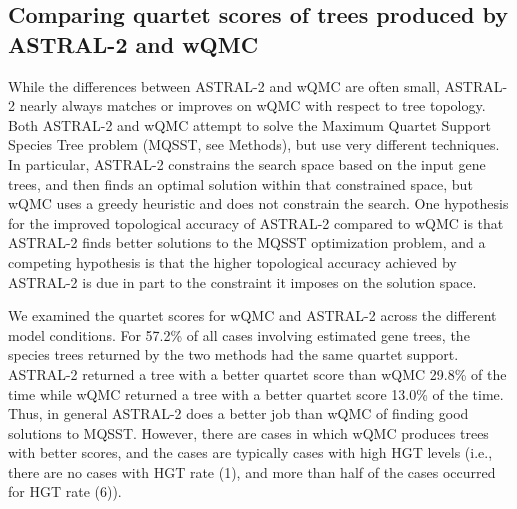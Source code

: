 \subsection{Comparing quartet scores of trees produced by ASTRAL-2 and wQMC}

While the differences between ASTRAL-2 and wQMC are often
small, ASTRAL-2 nearly always matches or improves on wQMC with respect to tree
topology.  Both ASTRAL-2 and wQMC attempt to 
solve the Maximum Quartet Support Species Tree problem (MQSST, see Methods), but
use very different techniques. In particular,  ASTRAL-2
constrains the search space based on the input gene trees, and
then finds an optimal solution within that constrained space, but
 wQMC uses a greedy
heuristic and does not constrain the search.  
One hypothesis for the improved topological accuracy of ASTRAL-2 compared to wQMC is
that ASTRAL-2 finds better solutions to the MQSST optimization problem, and
a competing hypothesis is that the higher topological
accuracy achieved by ASTRAL-2 is 
due in part 
to the constraint it imposes on the solution space.  




We examined the quartet scores for  wQMC and ASTRAL-2
across the different model conditions.
%
For  57.2\% of all cases involving estimated gene trees, the species trees returned by the two methods had the same quartet support.  ASTRAL-2 returned a tree with a better quartet score than wQMC 29.8\% of the time while wQMC returned a tree with a better quartet score 13.0\% of the time.  
Thus, in general ASTRAL-2 does a better job than wQMC of finding good solutions to MQSST. 
However, there are cases in which wQMC produces trees with better scores, and the cases
are typically cases with high HGT levels (i.e., there are no cases with HGT rate (1), and  more than half of the cases occurred for HGT rate (6)).  

